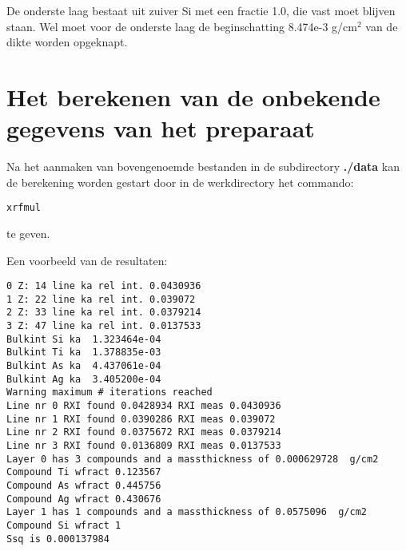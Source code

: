 De onderste laag bestaat uit zuiver Si met een fractie 1.0,
 die vast moet blijven
staan. Wel moet voor de onderste laag de beginschatting 8.474e-3 g/cm$^2$
van de dikte worden opgeknapt.

\section*{Het berekenen van de onbekende gegevens van het preparaat}
Na het aanmaken van bovengenoemde bestanden in de subdirectory {\bf ./data}
kan de berekening worden gestart door in de werkdirectory
het commando:
\begin{verbatim}
xrfmul
\end{verbatim}
te geven.

Een voorbeeld van de resultaten:
\begin{verbatim}
0 Z: 14 line ka rel int. 0.0430936 
1 Z: 22 line ka rel int. 0.039072 
2 Z: 33 line ka rel int. 0.0379214 
3 Z: 47 line ka rel int. 0.0137533 
Bulkint Si ka  1.323464e-04 
Bulkint Ti ka  1.378835e-03 
Bulkint As ka  4.437061e-04 
Bulkint Ag ka  3.405200e-04 
Warning maximum # iterations reached 
Line nr 0 RXI found 0.0428934 RXI meas 0.0430936
Line nr 1 RXI found 0.0390286 RXI meas 0.039072
Line nr 2 RXI found 0.0375672 RXI meas 0.0379214
Line nr 3 RXI found 0.0136809 RXI meas 0.0137533
Layer 0 has 3 compounds and a massthickness of 0.000629728  g/cm2
Compound Ti wfract 0.123567  
Compound As wfract 0.445756  
Compound Ag wfract 0.430676  
Layer 1 has 1 compounds and a massthickness of 0.0575096  g/cm2
Compound Si wfract 1  
Ssq is 0.000137984
\end{verbatim}


